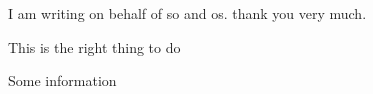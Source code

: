 \documentclass{letter}
\begin{document}
\begin{letter}{}



\opening{}





\summary I am writing on behalf of so and os. thank you very much.

\justification This is the right thing to do

\signaturelines

\studentprovided
Some information

\end{letter}
\end{document}
